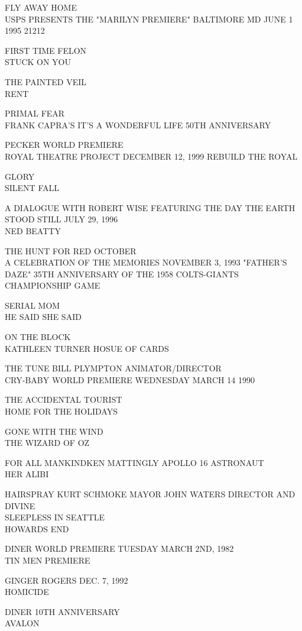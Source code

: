 \documentclass[10pt,letterpaper]{article}
\begin{document}
FLY AWAY HOME\\
USPS PRESENTS THE "MARILYN PREMIERE" BALTIMORE MD JUNE 1 1995 21212

FIRST TIME FELON\\
STUCK ON YOU

THE PAINTED VEIL\\
RENT

PRIMAL FEAR\\
FRANK CAPRA'S IT'S A WONDERFUL LIFE 50TH ANNIVERSARY

PECKER WORLD PREMIERE\\
ROYAL THEATRE PROJECT DECEMBER 12, 1999 REBUILD THE ROYAL

GLORY\\
SILENT FALL

A DIALOGUE WITH ROBERT WISE FEATURING THE DAY THE EARTH STOOD STILL JULY 29, 1996\\
NED BEATTY

THE HUNT FOR RED OCTOBER\\
A CELEBRATION OF THE MEMORIES NOVEMBER 3, 1993 "FATHER'S DAZE" 35TH ANNIVERSARY OF THE 1958 COLTS{-}GIANTS CHAMPIONSHIP GAME

SERIAL MOM\\
HE SAID SHE SAID

ON THE BLOCK\\
KATHLEEN TURNER HOSUE OF CARDS

THE TUNE BILL PLYMPTON ANIMATOR/DIRECTOR\\
CRY{-}BABY WORLD PREMIERE WEDNESDAY MARCH 14 1990

THE ACCIDENTAL TOURIST\\
HOME FOR THE HOLIDAYS

GONE WITH THE WIND\\
THE WIZARD OF OZ

FOR ALL MANKINDKEN MATTINGLY APOLLO 16 ASTRONAUT\\
HER ALIBI

HAIRSPRAY KURT SCHMOKE MAYOR JOHN WATERS DIRECTOR AND DIVINE\\
SLEEPLESS IN SEATTLE\\
HOWARDS END

DINER WORLD PREMIERE TUESDAY MARCH 2ND, 1982\\
TIN MEN PREMIERE

GINGER ROGERS DEC. 7, 1992\\
HOMICIDE

DINER 10TH ANNIVERSARY\\
AVALON
\end{document}

